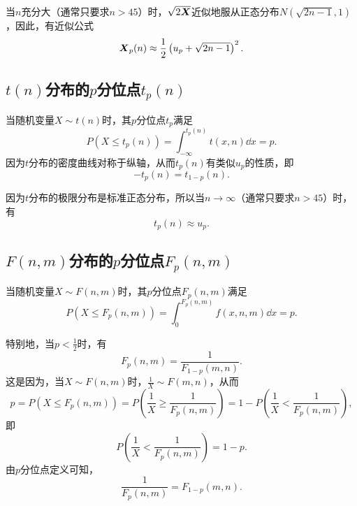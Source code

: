 当\(n\)充分大（通常只要求\(n>45\)）时，\(\sqrt{2\boldsymbol{X}}\)近似地服从正态分布\(N(\sqrt{2n-1},1)\)，因此，有近似公式\begin{equation}
\boldsymbol{X}_p(n) \approx \frac{1}{2}\left(u_p+\sqrt{2n-1}\right)^2.
\end{equation}

\subsection{\texorpdfstring{\(t(n)\)分布的\(p\)分位点\(t_p(n)\)}{t分布的p分位点}}
当随机变量\(X \sim t(n)\)时，其\(p\)分位点\(t_p\)满足\[
P(X \leq t_p(n))
= \int_{-\infty}^{t_p(n)} t(x,n) \dd{x} = p.
\]因为\(t\)分布的密度曲线对称于纵轴，从而\(t_p(n)\)有类似\(u_p\)的性质，即\begin{equation}
-t_p(n)=t_{1-p}(n).
\end{equation}

因为\(t\)分布的极限分布是标准正态分布，所以当\(n\to\infty\)（通常只要求\(n>45\)）时，有\[
t_p(n) \approx u_p.
\]

\subsection{\texorpdfstring{\(F(n,m)\)分布的\(p\)分位点\(F_p(n,m)\)}{F分布的p分位点}}
当随机变量\(X \sim F(n,m)\)时，其\(p\)分位点\(F_p(n,m)\)满足\[
P(X \leq F_p(n,m)) = \int_0^{F_p(n,m)} f(x,n,m) \dd{x} = p.
\]

特别地，当\(p<\frac{1}{2}\)时，有\begin{equation}
F_p(n,m) = \frac{1}{F_{1-p}(m,n)}.
\end{equation}
这是因为，当\(X \sim F(n,m)\)时，\(\frac{1}{X} \sim F(m,n)\)，从而\[
p = P(X \leq F_p(n,m))
= P\left(\frac{1}{X} \geq \frac{1}{F_p(n,m)}\right)
= 1 - P\left(\frac{1}{X} < \frac{1}{F_p(n,m)}\right),
\]即\[
P\left(\frac{1}{X} < \frac{1}{F_p(n,m)}\right) = 1 - p.
\]由\(p\)分位点定义可知，\[
\frac{1}{F_p(n,m)} = F_{1-p}(m,n).
\]

